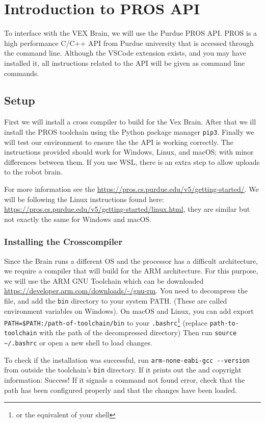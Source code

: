 \documentclass[main.tex]{subfiles}
\begin{document}
\section{Introduction to PROS API}
To interface with the VEX Brain, we will use the Purdue PROS API.
PROS is a high performance C/C++ API from Purdue university that is accessed through the command line.
Although the VSCode extension exists, and you may have installed it,
    all instructions related to the API will be given as command line commands.

\subsection{Setup}
First we will install a cross compiler to build for the Vex Brain.
After that we ill install the PROS toolchain using the Python package manager \verb|pip3|.
Finally we will test our environment to ensure the the API is working correctly.
The instructions provided should work for Windows, Linux, and macOS; with minor differences between them.
If you use WSL, there is an extra step to allow uploads to the robot brain.

For more information see the \href{PROS Website}{https://pros.cs.purdue.edu/v5/getting-started/}.
We will be following the Linux instructions found here: \url{https://pros.cs.purdue.edu/v5/getting-started/linux.html},
    they are similar but not exactly the same for Windows and macOS.

\subsubsection{Installing the Crosscompiler}
Since the Brain runs a different OS and the processor has a difficult architecture,
    we require a compiler that will build for the ARM architecture.
For this purpose, we will use the ARM GNU Toolchain which can be downloaded \href{here}{https://developer.arm.com/downloads/-/gnu-rm}.
You need to decompress the file, and add the \verb|bin| directory to your system PATH.
(These are called environment variables on Windows).
On macOS and Linux, you can add export \verb|PATH=$PATH:/path-of-toolchain/bin| to your \verb|.bashrc|\footnote{or the equivalent of your shell}
    (replace \verb|path-to-toolchain| with the path of the decompressed directory)
Then run \verb|source ~/.bashrc| or open a new shell to load changes.

To check if the installation was successful, run \verb|arm-none-eabi-gcc --version| from outside the toolchain's \verb|bin| directory.
If it prints out the and copyright information: Success! 
If it signals a command not found error, check that the path has been configured properly
    and that the changes have been loaded.
\end{document}
